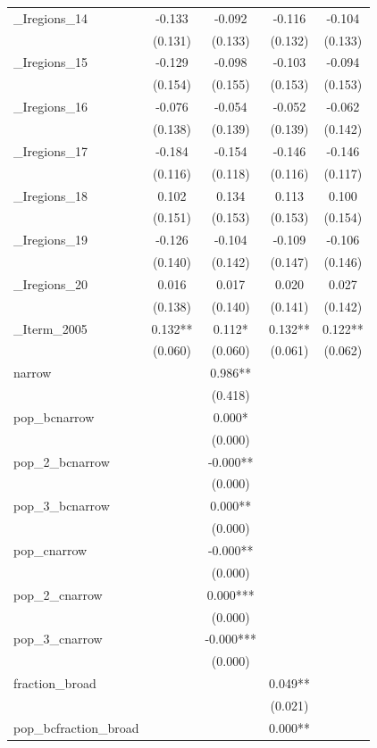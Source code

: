 \documentclass[]{article}
\begin{document}
\begin{tabular}{lcccc}
\_Iregions\_14 & -0.133 & -0.092 & -0.116 & -0.104 \\
 & (0.131) & (0.133) & (0.132) & (0.133) \\
\_Iregions\_15 & -0.129 & -0.098 & -0.103 & -0.094 \\
 & (0.154) & (0.155) & (0.153) & (0.153) \\
\_Iregions\_16 & -0.076 & -0.054 & -0.052 & -0.062 \\
 & (0.138) & (0.139) & (0.139) & (0.142) \\
\_Iregions\_17 & -0.184 & -0.154 & -0.146 & -0.146 \\
 & (0.116) & (0.118) & (0.116) & (0.117) \\
\_Iregions\_18 & 0.102 & 0.134 & 0.113 & 0.100 \\
 & (0.151) & (0.153) & (0.153) & (0.154) \\
\_Iregions\_19 & -0.126 & -0.104 & -0.109 & -0.106 \\
 & (0.140) & (0.142) & (0.147) & (0.146) \\
\_Iregions\_20 & 0.016 & 0.017 & 0.020 & 0.027 \\
 & (0.138) & (0.140) & (0.141) & (0.142) \\
\_Iterm\_2005 & 0.132** & 0.112* & 0.132** & 0.122** \\
 & (0.060) & (0.060) & (0.061) & (0.062) \\
narrow &  & 0.986** &  &  \\
 &  & (0.418) &  &  \\
pop\_bcnarrow &  & 0.000* &  &  \\
 &  & (0.000) &  &  \\
pop\_2\_bcnarrow &  & -0.000** &  &  \\
 &  & (0.000) &  &  \\
pop\_3\_bcnarrow &  & 0.000** &  &  \\
 &  & (0.000) &  &  \\
pop\_cnarrow &  & -0.000** &  &  \\
 &  & (0.000) &  &  \\
pop\_2\_cnarrow &  & 0.000*** &  &  \\
 &  & (0.000) &  &  \\
pop\_3\_cnarrow &  & -0.000*** &  &  \\
 &  & (0.000) &  &  \\
fraction\_broad &  &  & 0.049** &  \\
 &  &  & (0.021) &  \\
pop\_bcfraction\_broad &  &  & 0.000** &  \\

\end{tabular}
\end{document}
